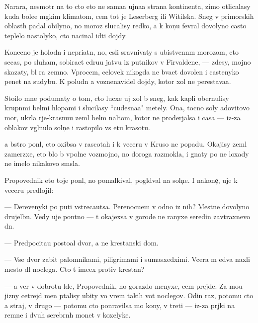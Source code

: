 \documentclass[10pt]{book}
\begin{document}
Narara, nesmotr{\ia} na to cto eto ne sama{\y}a {\y}ujna{\y}a strana kontinenta, zimo{\y} otlicalasy kuda bole{\y}e m{\ia}gkim klimatom, cem tot je Leserberg ili Witilska. Sneg v primorskih oblast{\ia}h padal obilyno, no moroz{\yi} slucalisy redko, a k kon{\c}u fevral{\ia} dovolyno casto teplelo nastolyko, cto nacinal idti dojdy.

Konecno je holodn{\yi}{\y} i nepri{\y}atn{\yi}{\y}, no, {\y}esli sravnivaty s ubi{\y}stvenn{\yi}m morozom, cto se{\y}cas, po sluham, sobira{\y}et {\x}edru{\y}u jatvu iz putnikov v Firvaldene, — zdesy, mojno skazaty, b{\yi}l ra{\y} zemno{\y}. Vprocem, celovek nikogda ne b{\yi}va{\y}et dovolen i castenyko pen{\ia}{\y}et na sudybu. K poludn{\iu} {\y}a voznenavidel dojdy, kotor{\yi}{\y} xol ne perestava{\y}a.

Sto{\y}ilo mne podumaty o tom, cto lucxe uj xol b{\yi} sneg, kak kapli obernulisy krupn{\yi}mi bel{\yi}mi hlop{\y}ami i slucilasy ``cudesna{\y}a" metely. Ona, tocno soly {\Y}adovitovo mor{\ia}, ukr{\yi}la r{\yi}je-krasnu{\y}u zeml{\iu} bel{\yi}m nal{\e}tom, kotor{\yi}{\y} ne proderjalsa i casa — iz-za oblakov v{\yi}gl{\ia}nulo soln{\c}e i rastopilo vs{\iu} etu krasotu.

{\Y}a b{\yi}stro pon{\ia}l, cto oxibsa v rascotah i k veceru v Kruso ne popadu. Okajisy zeml{\ia} zamerzxe{\y}, eto b{\yi}lo b{\yi} vpolne vozmojno, no doroga razmokla, i gnaty po ne{\y} loxady ne imelo nikakovo sm{\yi}sla.

Propovednik eto toje pon{\ia}l, no pomalkival, pogl{\ia}d{\yi}val na soln{\c}e. I nakone{\c}, uje k veceru predlojil:

— Derevenyki po puti vstreca{\y}utsa. Perenocu{\y}em v odno{\y} iz nih? Mestn{\yi}{\y}e dovolyno drujel{\iu}bn{\yi}. Vedy uje pon{\ia}tno — t{\yi} okajexsa v gorode ne ranyxe seredin{\yi} zavtraxnevo dn{\ia}.

— Predpocita{\y}u posto{\y}al{\yi}{\y} dvor, a ne krest{\y}anski{\y} dom.

— Vse dvor{\yi} zabit{\yi} palomnikami, piligrimami i sumasxedximi. Vcera m{\yi} {\y}edva naxli mesto dl{\ia} noclega. Cto t{\yi} ime{\y}ex protiv krest{\y}an?

— {\Y}a ver{\iu} v dobrotu l{\iu}de{\y}, Propovednik, no gorazdo menyxe, cem prejde. Za mo{\y}u jizny cet{\yi}rejd{\yi} men{\ia} p{\yi}talisy ubity vo vrem{\ia} takih vot noclegov. Odin raz, potomu cto {\y}a straj, v drugo{\y} — potomu cto ponravilsa mo{\y} kony, v treti{\y} — iz-za pr{\ia}jki na remne i dvuh serebr{\ia}n{\yi}h monet v koxelyke.
\end{document}
